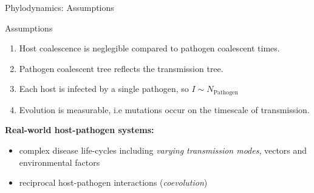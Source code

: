 \documentclass[presentation]{beamer}
\begin{document}
\begin{frame}[label={sec:org3ff913e}]{Phylodynamics: Assumptions}
\begin{block}{Assumptions}
\begin{enumerate}
\item Host coalescence is neglegible compared to pathogen coalescent times.
\item Pathogen coalescent tree reflects the transmission tree.
\item Each host is infected by a single pathogen, so \(I \sim N_{\text{Pathogen}}\)
\item Evolution is measurable, i.e mutations occur on the timescale of transmission.
\end{enumerate}
\end{block}
\vspace{5pt}
\textbf{Real-world host-pathogen systems:}\\
\begin{itemize}
\item complex disease life-cycles including \emph{varying transmission modes}, vectors and environmental factors
\item reciprocal host-pathogen interactions (\emph{coevolution})
\end{itemize}
\end{frame}
\end{document}
